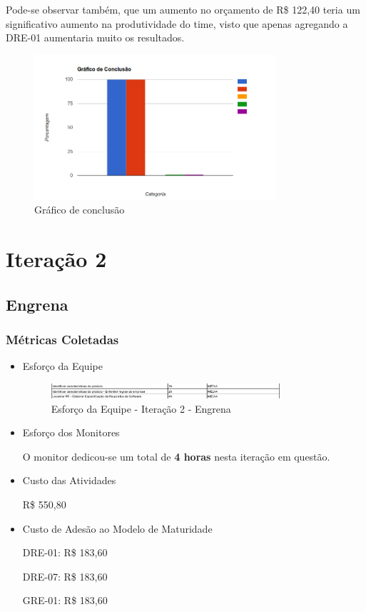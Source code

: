 Pode-se observar também, que um aumento no orçamento de R\$ 122,40 teria um significativo aumento na produtividade do time, visto que apenas agregando a DRE-01 aumentaria muito os resultados.

\begin{figure}[H]
  \center
  \includegraphics[width=0.8\textwidth]{figuras/plot1}
  \caption{Gráfico de conclusão}
  \label{fig:plot1}
\end{figure}

\section{Iteração 2}

\subsection{Engrena}

\subsubsection{Métricas Coletadas}

\begin{itemize}
\item Esforço da Equipe

\begin{figure}[H]
    \center
    \includegraphics[width=0.8\textwidth]{figuras/esforco-eqp3}
    \caption{Esforço da Equipe - Iteração 2 - Engrena}
    \label{fig:esforco-eqp3}
\end{figure}

\item Esforço dos Monitores

O monitor dedicou-se um total de \textbf{4 horas} nesta iteração em questão.

\item Custo das Atividades

R\$ 550,80

\item Custo de Adesão ao Modelo de Maturidade

DRE-01: R\$ 183,60

DRE-07: R\$ 183,60

GRE-01: R\$ 183,60


\end{itemize}

